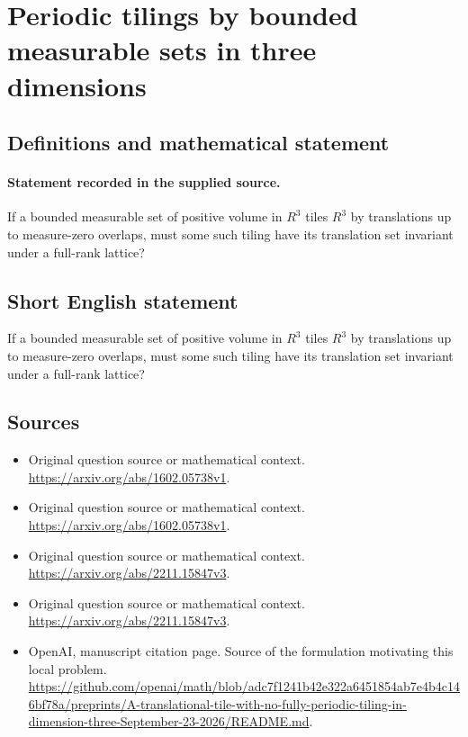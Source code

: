 \documentclass[11pt]{article}
\begin{document}
\section*{Periodic tilings by bounded measurable sets in three dimensions}\label{30007098}
\subsection{Definitions and mathematical statement}
\paragraph{Statement recorded in the supplied source.}
If a bounded measurable set of positive volume in $R^3$ tiles $R^3$ by translations up to measure-zero overlaps, must some such tiling have its translation set invariant under a full-rank lattice?
\subsection{Short English statement}
If a bounded measurable set of positive volume in $R^3$ tiles $R^3$ by translations up to measure-zero overlaps, must some such tiling have its translation set invariant under a full-rank lattice?
\subsection{Sources}
\begin{itemize}
\item[S1] Original question source or mathematical context.
\url{https://arxiv.org/abs/1602.05738v1}.
\item[S2] Original question source or mathematical context.
\url{https://arxiv.org/abs/1602.05738v1}.
\item[S3] Original question source or mathematical context.
\url{https://arxiv.org/abs/2211.15847v3}.
\item[S4] Original question source or mathematical context.
\url{https://arxiv.org/abs/2211.15847v3}.
\item[S5] OpenAI, manuscript citation page. Source of the formulation motivating this local problem.
\url{https://github.com/openai/math/blob/adc7f1241b42e322a6451854ab7e4b4c146bf78a/preprints/A-translational-tile-with-no-fully-periodic-tiling-in-dimension-three-September-23-2026/README.md}.
\end{itemize}
\end{document}
